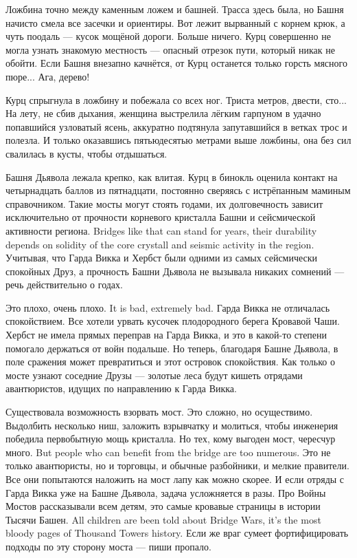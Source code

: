 Ложбина точно между каменным ложем и башней.
Трасса здесь была, но Башня начисто смела все засечки и ориентиры.
Вот лежит вырванный с корнем крюк, а чуть поодаль --- кусок мощёной дороги.
Больше ничего.
Курц совершенно не могла узнать знакомую местность --- опасный отрезок пути, который никак не обойти.
Если Башня внезапно качнётся, от Курц останется только горсть мясного пюре...
Ага, дерево!

Курц спрыгнула в ложбину и побежала со всех ног.
Триста метров, двести, сто...
На лету, не сбив дыхания, женщина выстрелила лёгким гарпуном в удачно попавшийся узловатый ясень, аккуратно подтянула запутавшийся в ветках трос и полезла.
И только оказавшись пятьюдесятью метрами выше ложбины, она без сил свалилась в кусты, чтобы отдышаться.

Башня Дьявола лежала крепко, как влитая.
Курц в бинокль оценила контакт на четырнадцать баллов из пятнадцати, постоянно сверяясь с истрёпанным маминым справочником.
{Такие мосты могут стоять годами, их долговечность зависит исключительно от прочности корневого кристалла Башни и сейсмической активности региона.}
{Bridges like that can stand for years, their durability depends on solidity of the core crystall and seismic activity in the region.}
Учитывая, что Гарда Викка и Хербст были одними из самых сейсмически спокойных Друз, а прочность Башни Дьявола не вызывала никаких сомнений --- речь действительно о годах.

{Это плохо, очень плохо.}
{It is bad, extremely bad.}
Гарда Викка не отличалась спокойствием.
Все хотели урвать кусочек плодородного берега Кровавой Чаши.
Хербст не имела прямых переправ на Гарда Викка, и это в какой-то степени помогало держаться от войн подальше.
Но теперь, благодаря Башне Дьявола, в поле сражения может превратиться и этот островок спокойствия.
Как только о мосте узнают соседние Друзы --- золотые леса будут кишеть отрядами авантюристов, идущих по направлению к Гарда Викка.

Существовала возможность взорвать мост.
Это сложно, но осуществимо.
Выдолбить несколько ниш, заложить взрывчатку и молиться, чтобы инженерия победила первобытную мощь кристалла.
{Но тех, кому выгоден мост, чересчур много.}
{But people who can benefit from the bridge are too numerous.}
Это не только авантюристы, но и торговцы, и обычные разбойники, и мелкие правители.
Все они попытаются наложить на мост лапу как можно скорее.
И если отряды с Гарда Викка уже на Башне Дьявола, задача усложняется в разы.
{Про Войны Мостов рассказывали всем детям, это самые кровавые страницы в истории Тысячи Башен.}
{All children are been told about Bridge Wars, it's the most bloody pages of Thousand Towers history.}
Если же враг сумеет фортифицировать подходы по эту сторону моста --- пиши пропало.

